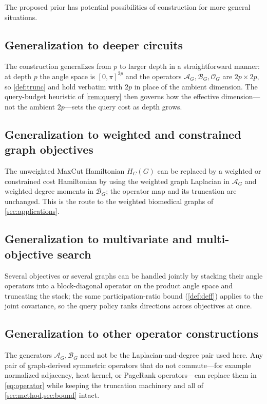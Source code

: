 \documentclass[aps,prxquantum,reprint,amsmath,amssymb,floatfix,nofootinbib,superscriptaddress,longbibliography]{revtex4-2}
\theoremstyle{remark}
\newcommand{\calO}{\mathcal{O}}
\newcommand{\calA}{\mathcal{A}}
\newcommand{\calB}{\mathcal{B}}
\begin{document}
The proposed prior has potential possibilities of construction for more general
situations.

\subsection{Generalization to deeper circuits}
\label{sec:deeper}
The construction generalizes from \(p\) to larger depth in a straightforward
manner: at depth \(p\) the angle space is \([0,\pi]^{2p}\) and the operators
\(\calA_G,\calB_G,\calO_G\) are \(2p\times2p\), so \cref{def:trunc} and
 hold verbatim with \(2p\) in place of the ambient
dimension.  The query-budget heuristic of \cref{rem:query} then governs how the
effective dimension---not the ambient \(2p\)---sets the query cost as depth grows.

\subsection{Generalization to weighted and constrained graph objectives}
\label{sec:weighted}
The unweighted MaxCut Hamiltonian \(H_C(G)\) can be replaced by a weighted or
constrained cost Hamiltonian by using the weighted graph Laplacian in \(\calA_G\)
and weighted degree moments in \(\calB_G\); the operator map and its truncation
are unchanged.  This is the route to the weighted biomedical graphs of
\cref{sec:applications}.

\subsection{Generalization to multivariate and multi-objective search}
\label{sec:multivariate}
Several objectives or several graphs can be handled jointly by stacking their
angle operators into a block-diagonal operator on the product angle space and
truncating the stack; the same participation-ratio bound (\cref{def:deff}) applies
to the joint covariance, so the query policy ranks directions across objectives at
once.

\subsection{Generalization to other operator constructions}
\label{sec:otherops}
The generators \(\calA_G,\calB_G\) need not be the Laplacian-and-degree pair used
here.  Any pair of graph-derived symmetric operators that do not commute---for
example normalized adjacency, heat-kernel, or PageRank operators---can replace
them in \cref{eq:operator} while keeping the truncation machinery and all of
\cref{sec:method,sec:bound} intact.
\end{document}
